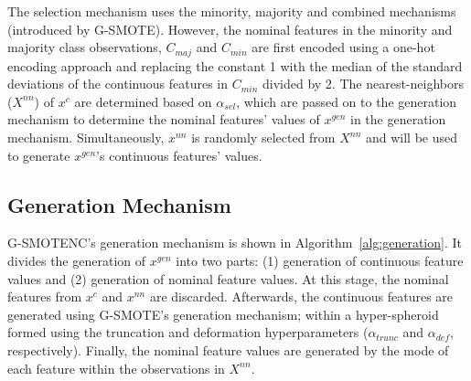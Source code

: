 \documentclass[parskip=full]{scrartcl}
\begin{document}
The selection mechanism uses the minority, majority and combined mechanisms
(introduced by G-SMOTE). However, the nominal features in the minority and
majority class observations, $C_{maj}$ and $C_{min}$ are first encoded using a
one-hot encoding approach and replacing the constant 1 with the median of the
standard deviations of the continuous features in $C_{min}$ divided by 2. The
nearest-neighbors ($X^{nn}$) of $x^c$ are determined based on $\alpha_{sel}$,
which are passed on to the generation mechanism to determine the nominal
features' values of $x^{gen}$ in the generation mechanism. Simultaneously,
$x^{nn}$ is randomly selected from $X^{nn}$ and will be used to generate
$x^{gen}$'s continuous features' values.

\subsection{Generation Mechanism}

G-SMOTENC's generation mechanism is shown in Algorithm~\ref{alg:generation}.
It divides the generation of $x^{gen}$ into two parts: (1) generation of
continuous feature values and (2) generation of nominal feature values. At
this stage, the nominal features from $x^c$ and $x^{nn}$ are discarded.
Afterwards, the continuous features are generated using G-SMOTE's generation
mechanism; within a hyper-spheroid formed using the truncation and deformation
hyperparameters ($\alpha_{trunc}$ and $\alpha_{def}$, respectively).  Finally,
the nominal feature values are generated by the mode of each feature within
the observations in $X^{nn}$.
\end{document}
